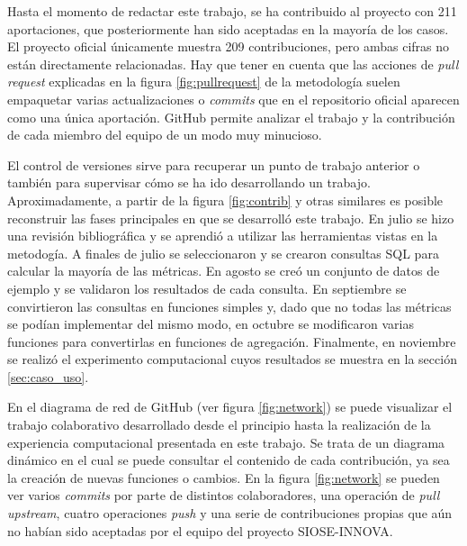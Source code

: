 Hasta el momento de redactar este trabajo, se ha contribuido al proyecto con 211 aportaciones, que posteriormente han sido aceptadas en la mayoría de los casos. El proyecto oficial únicamente muestra 209 contribuciones, pero ambas cifras no están directamente relacionadas. Hay que tener en cuenta que las acciones de \textit{pull request} explicadas en la figura \ref{fig:pullrequest} de la metodología suelen empaquetar varias actualizaciones o \textit{commits} que en el repositorio oficial aparecen como una única aportación. GitHub permite analizar el trabajo y la contribución de cada miembro del equipo de un modo muy minucioso.

El control de versiones sirve para recuperar un punto de trabajo anterior o también para supervisar cómo se ha ido desarrollando un trabajo. Aproximadamente, a partir de la figura \ref{fig:contrib} y otras similares es posible reconstruir las fases principales en que se desarrolló este trabajo. En julio se hizo una revisión bibliográfica y se aprendió a utilizar las herramientas vistas en la metodogía. A finales de julio se seleccionaron y se crearon consultas SQL para calcular la mayoría de las métricas. En agosto se creó un conjunto de datos de ejemplo y se validaron los resultados de cada consulta. En septiembre se convirtieron las consultas en funciones simples y, dado que no todas las métricas se podían implementar del mismo modo, en octubre se modificaron varias funciones para convertirlas en funciones de agregación. Finalmente, en noviembre se realizó el experimento computacional cuyos resultados se muestra en la sección \ref{sec:caso_uso}.

En el diagrama de red de GitHub (ver figura \ref{fig:network}) se puede visualizar el trabajo colaborativo desarrollado desde el principio hasta la realización de la experiencia computacional presentada en este trabajo. Se trata de un diagrama dinámico en el cual se puede consultar el contenido de cada contribución, ya sea la creación de nuevas funciones o cambios. En la figura \ref{fig:network} se pueden ver varios \textit{commits} por parte de distintos colaboradores, una operación de \textit{pull upstream}, cuatro operaciones \textit{push} y una serie de contribuciones propias que aún no habían sido aceptadas por el equipo del proyecto SIOSE-INNOVA.

